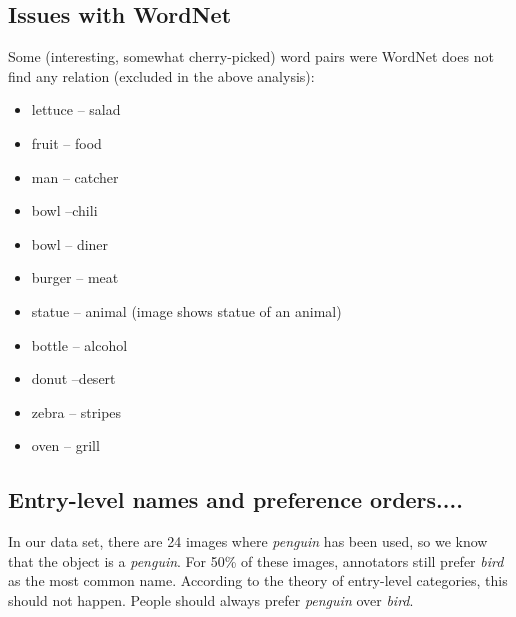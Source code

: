 \documentclass[11pt,a4paper]{article}
\begin{document}
\subsection{Issues with WordNet}



Some (interesting, somewhat cherry-picked) word pairs were WordNet does not find any relation (excluded in the above analysis):

\begin{itemize}
\item lettuce -- salad
\item fruit -- food
\item man -- catcher
\item bowl --chili
\item bowl -- diner
\item burger -- meat
\item statue -- animal (image shows statue of an animal)
\item bottle -- alcohol
\item donut --desert
\item zebra -- stripes
\item oven -- grill
\end{itemize}



\subsection{Entry-level names and preference orders....}

 In our data set, there are 24 images where \textit{penguin} has been used, so we know that the object is a \textit{penguin}. For 50\% of these images, annotators still prefer \textit{bird} as the most common name. According to the theory of entry-level categories, this should not happen. People should always prefer \textit{penguin} over \textit{bird}. 

\end{document}
